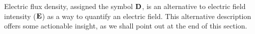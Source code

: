 

\label{m0011_Electric_Flux_Density} %

Electric flux density, assigned the symbol ${\bf D}$, is an alternative to electric field intensity (${\bf E}$) as a way to quantify an electric field.
This alternative description offers some actionable insight, as we shall point out at the end of this section.

